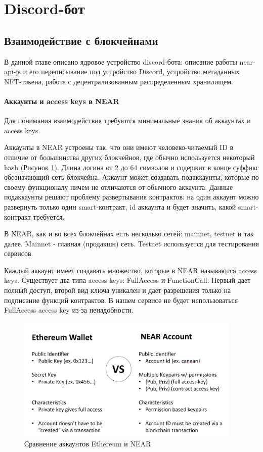 \section{Discord-бот}
\label{section.main.bot}

\subsection{Взаимодействие с блокчейнами}

В данной главе описано ядровое устройство discord-бота: описание работы near-api-js и его переписывание под устройство Discord, устройство метаданных NFT-токена, работа с децентрализованным распределенным хранилищем.

\paragraph{Аккаунты и access keys в NEAR}
Для понимания взаимодействия требуются минимальные знания об аккаунтах и access keys.

Аккаунты в NEAR \cite{nearaccounts} устроены так, что они имеют человеко-читаемый ID в отличие от большинства других блокчейнов, где обычно используется некоторый hash (Рисунок {\color{blue} \ref{fig.eth_near_cmp}}). Длина логина от 2 до 64 символов и содержит в конце суффикс обозначающий сеть блокчейна. Аккаунт может создавать подаккаунты, которые по своему функционалу ничем не отличаются от обычного аккаунта. Данные подаккаунты решают проблему развертывания контрактов: на один аккаунт можно развернуть только один smart-контракт, id аккаунта и будет значить, какой smart-контракт требуется.

\begin{definition}
    В NEAR, как и во всех блокчейнах есть несколько сетей: mainnet, testnet и так далее. Mainnet - главная (продакшн) сеть. Testnet используется для тестирования сервисов.
\end{definition}

Каждый аккаунт имеет создавать множество, которые в NEAR называются access keys. Существует два типа access keys: FullAccess и FunctionCall. Первый дает полный доступ, второй вид ключа уникален и дает разрешения только на подписание функций контрактов. В нашем сервисе не будет использоваться FullAccess access key из-за ненадобности.

\begin{figure}
    \centering
    \includegraphics[height=60mm]{fig/eth_near_cmp.png}
    \caption{Сравнение аккаунтов Ethereum и NEAR}
    \label{fig.eth_near_cmp}
\end{figure}

